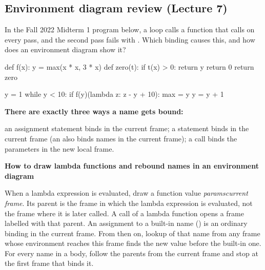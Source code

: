\documentclass[10pt]{scrartcl}
\newenvironment{howto}[1]{\begin{mdframed}[style=howtostyle]{\color{NavyBlue}\textbf{#1}}\par\vspace{2pt}}{\end{mdframed}}
\begin{document}
\subsection{Environment diagram review (Lecture 7)}
\begin{qbox}
  In the Fall 2022 Midterm 1 program below, a loop calls a function that calls  on every pass, and the second pass fails with . Which binding causes this, and how does an environment diagram show it?
\end{qbox}
\begin{py}
def f(x):
    y = max(x * x, 3 * x)
    def zero(t):
        if t(x) > 0:
            return y
        return 0
    return zero

y = 1
while y < 10:
    if f(y)(lambda z: z - y + 10):
        max = y
    y = y + 1
\end{py}
\textbf{There are exactly three ways a name gets bound:}
\begin{itemize}
  \ii an assignment statement binds in the current frame;
  \ii a  statement binds in the current frame (an  also binds names in the current frame);
  \ii a call binds the parameters in the new local frame.
\end{itemize}
\begin{howto}{How to draw lambda functions and rebound names in an environment diagram}
\begin{steps}
  \ii When a lambda expression is evaluated, draw a function value \emph{params}\cd{) <line N> [parent=}\emph{current frame}\cd{]}. Its parent is the frame in which the lambda expression is evaluated, not the frame where it is later called.
  \ii A call of a lambda function opens a frame labelled  with that parent.
  \ii An assignment to a built-in name () is an ordinary binding in the current frame. From then on, lookup of that name from any frame whose environment reaches this frame finds the new value before the built-in one.
  \ii For every name in a body, follow the parents from the current frame and stop at the first frame that binds it.
\end{steps}
\end{howto}
\end{document}
